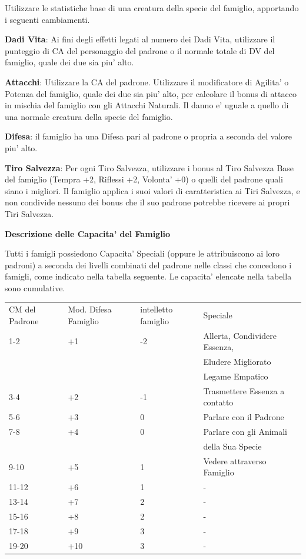\documentclass[a4paper,11pt,twoside,openany]{dndbook}
\begin{document}
\bigskip

Utilizzare le statistiche base di una creatura della specie del famiglio, apportando i seguenti cambiamenti.

\bigskip

\textbf{Dadi Vita}: Ai fini degli effetti legati al numero dei Dadi Vita, utilizzare il punteggio di CA del personaggio del padrone o il normale totale di DV del famiglio, quale dei due sia piu' alto.

\textbf{Attacchi}: Utilizzare la CA del padrone. Utilizzare il modificatore di Agilita' o Potenza del famiglio, quale dei due sia piu' alto, per calcolare il bonus di attacco in mischia del famiglio con gli Attacchi Naturali. Il danno e' uguale a quello di una normale creatura della specie del famiglio.

\textbf{Difesa}: il famiglio ha una Difesa pari al padrone o propria a seconda del valore piu' alto.

\textbf{Tiro Salvezza}: Per ogni Tiro Salvezza, utilizzare i bonus al Tiro Salvezza Base del famiglio (Tempra +2, Riflessi +2, Volonta' +0) o quelli del padrone quali siano i migliori. Il famiglio applica i suoi valori di caratteristica ai Tiri Salvezza, e non condivide nessuno dei bonus che il suo padrone potrebbe ricevere ai propri Tiri Salvezza.

\bigskip

\textbf{Descrizione delle Capacita' del Famiglio}

Tutti i famigli possiedono Capacita' Speciali (oppure le attribuiscono ai loro padroni) a seconda dei livelli combinati del padrone nelle classi che concedono i famigli, come indicato nella tabella seguente. Le capacita' elencate nella tabella sono cumulative.

\bigskip

\begin{tabular}[c]{@{}llll@{}}
\toprule 
CM del Padrone & Mod. Difesa Famiglio & intelletto famiglio & Speciale\tabularnewline
1-2 & +1 & -2 & Allerta, Condividere Essenza, \tabularnewline &&& Eludere Migliorato\\
&&&Legame Empatico\tabularnewline
3-4 & +2 & -1 & Trasmettere Essenza a contatto\tabularnewline
5-6 & +3 & 0 & Parlare con il Padrone\tabularnewline
7-8 & +4 & 0 & Parlare con gli Animali\\
&&&della Sua Specie\tabularnewline
9-10 & +5 & 1 & Vedere attraverso Famiglio\tabularnewline
11-12 & +6 & 1 & -\tabularnewline
13-14 & +7 & 2 & -\tabularnewline
15-16 & +8 & 2 & -\tabularnewline
17-18 & +9 & 3 & -\tabularnewline
19-20 & +10 & 3 & -\tabularnewline
\bottomrule
\end{tabular}
\bigskip
\end{document}
